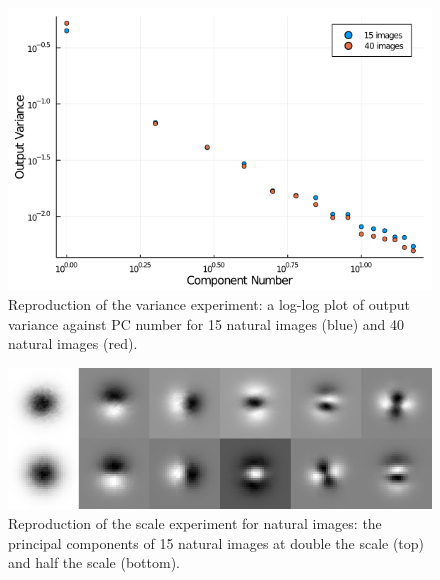 \begin{figure}
    \centering
    \includegraphics[scale=0.55]{figures/julia-fig5.png}
    \caption{Reproduction of the variance experiment: a log-log plot of output variance against PC number for 15 natural images (blue) and 40 natural images (red).}
    \label{fig:Figure5}
\end{figure}

 \begin{figure}
    \centering
    \includegraphics[scale=0.37]{figures/julia-fig6.png}
    \caption{Reproduction of the scale experiment for natural images: the principal components of 15 natural images at double the scale (top) and half the scale (bottom).}
    \label{fig:Figure6}
\end{figure}

